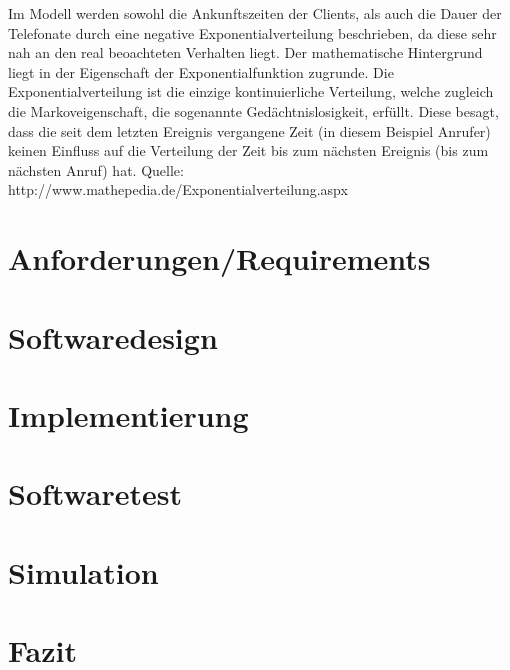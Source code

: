 Im Modell werden sowohl die Ankunftszeiten der Clients, als auch die Dauer der Telefonate durch eine negative Exponentialverteilung beschrieben, da diese sehr nah an den real beoachteten Verhalten liegt. Der mathematische Hintergrund liegt in der Eigenschaft der Exponentialfunktion zugrunde. Die Exponentialverteilung ist die einzige kontinuierliche Verteilung, welche zugleich die Markoveigenschaft, die sogenannte Gedächtnislosigkeit, erfüllt. Diese besagt, dass die seit dem letzten Ereignis vergangene Zeit (in diesem Beispiel Anrufer) keinen Einfluss auf die Verteilung der Zeit bis zum nächsten Ereignis (bis zum nächsten Anruf) hat. 
Quelle: http://www.mathepedia.de/Exponentialverteilung.aspx


\section{Anforderungen/Requirements}

\section{Softwaredesign}

\section{Implementierung}

\section{Softwaretest}

\section{Simulation}

\section{Fazit}


